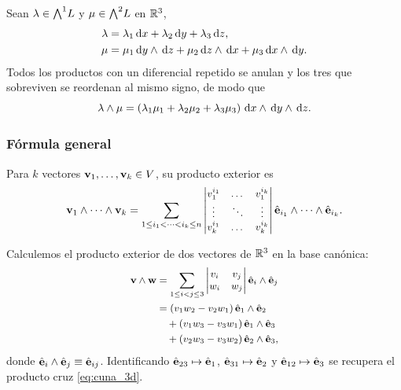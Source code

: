 \begin{ejemplo}
  \label{ej:uno_por_dos}
  Sean $\lambda\in\textstyle\bigwedge^{1}\!L$ y $\mu\in\textstyle\bigwedge^{2}\!L$ en $\mathbb{R}^3$,
  \begin{equation}
    \label{eq:lambda_mu}
    \begin{aligned}
      \lambda&=\lambda_1\,\mathrm{d} x+\lambda_2\,\mathrm{d} y+\lambda_3\,\mathrm{d} z,\\
      \mu&=\mu_1\,\mathrm{d} y\wedge\,\mathrm{d} z+\mu_2\,\mathrm{d} z\wedge\,\mathrm{d} x
          +\mu_3\,\mathrm{d} x\wedge\,\mathrm{d} y .
    \end{aligned}
  \end{equation}
  Todos los productos con un diferencial repetido se anulan y los tres que
  sobreviven se reordenan al mismo signo, de modo que
  \begin{equation}
    \label{eq:lambda_cuna_mu}
    \lambda\wedge\mu=\left( \lambda_1\mu_1+\lambda_2\mu_2+\lambda_3\mu_3 \right)
      \,\mathrm{d} x\wedge\,\mathrm{d} y\wedge\,\mathrm{d} z .
  \end{equation}
\end{ejemplo}

\subsubsection{F\'ormula general}
\label{subsubsec:formula_general_cuna}

Para $k$ vectores $\mathbf{v}_1,\dots,\mathbf{v}_k\in V$, su producto exterior es
\begin{equation}
  \label{eq:cuna_general}
  \small
  \mathbf{v}_1\wedge\dots\wedge\mathbf{v}_k
    =\sum_{1\le i_1<\dots<i_k\le n}
    \begin{vmatrix}
      v_1^{i_1} & \dots & v_1^{i_k}\\
      \vdots & \ddots & \vdots\\
      v_k^{i_1} & \dots & v_k^{i_k}
    \end{vmatrix}
    \hat{\mathbf{e}}_{i_1}\wedge\dots\wedge\hat{\mathbf{e}}_{i_k}.
\end{equation}

\begin{ejemplo}
  \label{ej:cuna_general_R3}
  Calculemos el producto exterior de dos vectores de $\mathbb{R}^3$ en la base
  can\'onica:
  \begin{equation}
    \label{eq:cuna_general_R3}
    \small
    \begin{aligned}
      \mathbf{v}\wedge\mathbf{w}
        &=\sum_{1\le i<j\le 3}
        \begin{vmatrix}
          v_i & v_j\\
          w_i & w_j
        \end{vmatrix}
        \hat{\mathbf{e}}_i\wedge\hat{\mathbf{e}}_j\\
        &=(v_1w_2-v_2w_1)\,\hat{\mathbf{e}}_1\wedge\hat{\mathbf{e}}_2\\
        &\quad+(v_1w_3-v_3w_1)\,\hat{\mathbf{e}}_1\wedge\hat{\mathbf{e}}_3\\
        &\quad+(v_2w_3-v_3w_2)\,\hat{\mathbf{e}}_2\wedge\hat{\mathbf{e}}_3 ,
    \end{aligned}
  \end{equation}
  donde $\hat{\mathbf{e}}_i\wedge\hat{\mathbf{e}}_j\equiv\hat{\mathbf{e}}_{ij}$. Identificando
  $\hat{\mathbf{e}}_{23}\mapsto\hat{\mathbf{e}}_1$, $\hat{\mathbf{e}}_{31}\mapsto\hat{\mathbf{e}}_2$ y
  $\hat{\mathbf{e}}_{12}\mapsto\hat{\mathbf{e}}_3$ se recupera el producto cruz
  \eqref{eq:cuna_3d}.
\end{ejemplo}

